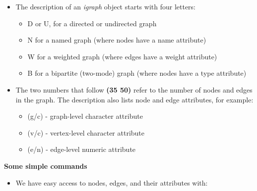 \documentclass[
]{article}
\newenvironment{Shaded}{\begin{snugshade}}{\end{snugshade}}
\newcommand{\CommentTok}[1]{\textcolor[rgb]{0.56,0.35,0.01}{\textit{#1}}}
\newcommand{\DecValTok}[1]{\textcolor[rgb]{0.00,0.00,0.81}{#1}}
\newcommand{\FunctionTok}[1]{\textcolor[rgb]{0.13,0.29,0.53}{\textbf{#1}}}
\newcommand{\NormalTok}[1]{#1}
\newcommand{\SpecialCharTok}[1]{\textcolor[rgb]{0.81,0.36,0.00}{\textbf{#1}}}
\providecommand{\tightlist}{%
  \setlength{\itemsep}{0pt}\setlength{\parskip}{0pt}}
\begin{document}
\begin{itemize}
\tightlist
\item
  The description of an \emph{igraph} object starts with four letters:

  \begin{itemize}
  \tightlist
  \item
    D or U, for a directed or undirected graph
  \item
    N for a named graph (where nodes have a name attribute)
  \item
    W for a weighted graph (where edges have a weight attribute)
  \item
    B for a bipartite (two-mode) graph (where nodes have a type attribute)
  \end{itemize}
\item
  The two numbers that follow \textbf{(35 50)} refer to the number of nodes and edges in the graph. The description also lists node and edge attributes, for example:

  \begin{itemize}
  \tightlist
  \item
    (g/c) - graph-level character attribute
  \item
    (v/c) - vertex-level character attribute
  \item
    (e/n) - edge-level numeric attribute
  \end{itemize}
\end{itemize}

\textbf{Some simple commands}

\begin{itemize}
\tightlist
\item
  We have easy access to nodes, edges, and their attributes with:
\end{itemize}

\footnotesize

\begin{Shaded}
\end{Shaded}
\end{document}
